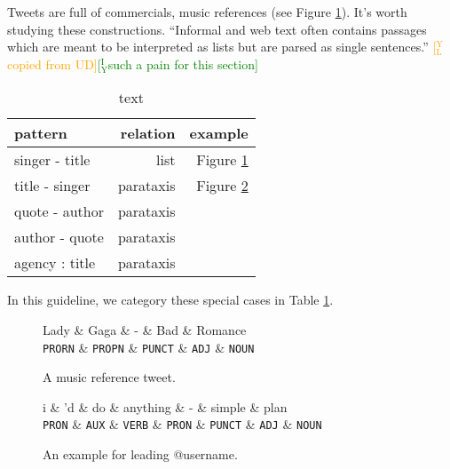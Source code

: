 \documentclass[11pt,a4paper]{article}
\newcommand{\yjcomment}[1]{\textcolor{orange}{[$_\mathrm{L}^\mathrm{Y}$#1]}}
\newcommand{\yicomment}[1]{\textcolor{green}{[$_\mathrm{Y}^\mathrm{I}$#1]}}
\begin{document}
Tweets are full of commercials, music references (see Figure \ref{fig:singer-title}).
It's worth studying these constructions.
``Informal and web text often contains passages which are meant to be
interpreted as lists but are parsed as single sentences.'' \yjcomment{copied from UD}\yicomment{such a pain for this section}

\begin{table}[t]
	\centering
	\begin{tabular}{lrr}
		\hline
		pattern & relation & example \\
		\hline
		singer - title & list & Figure \ref{fig:singer-title} \\
		title - singer & parataxis & Figure \ref{fig:title-singer} \\
		quote - author & parataxis & \\
		author - quote & parataxis & \\
		agency : title & parataxis & \\
		\hline
	\end{tabular}
\caption{text}\label{tbl:list-construct}
\end{table}

In this guideline, we category these special cases in Table \ref{tbl:list-construct}.

\begin{figure}[t]
	\centering
	\small
	\begin{dependency}[edge slant=2, text only label, label style=above]
		\begin{deptext}
			Lady  \& Gaga \& - \& Bad \& Romance \\
			\texttt{PRORN} \& \texttt{PROPN} \& \texttt{PUNCT} \& \texttt{ADJ} \& \texttt{NOUN} \\
		\end{deptext}
	\end{dependency}
	\caption{A music reference tweet.}\label{fig:singer-title}
\end{figure}

\begin{figure}[t]
	\centering
	\small
	\begin{dependency}[edge slant=2, text only label, label style=above]
		\begin{deptext}
			i \& 'd \& do \& anything \& - \& simple \& plan \\
			\texttt{PRON} \& \texttt{AUX} \& \texttt{VERB} \& \texttt{PRON} \& \texttt{PUNCT} \& \texttt{ADJ} \& \texttt{NOUN} \\
		\end{deptext}
	\end{dependency}
	\caption{An example for leading @username.}\label{fig:title-singer}
\end{figure}
\end{document}
